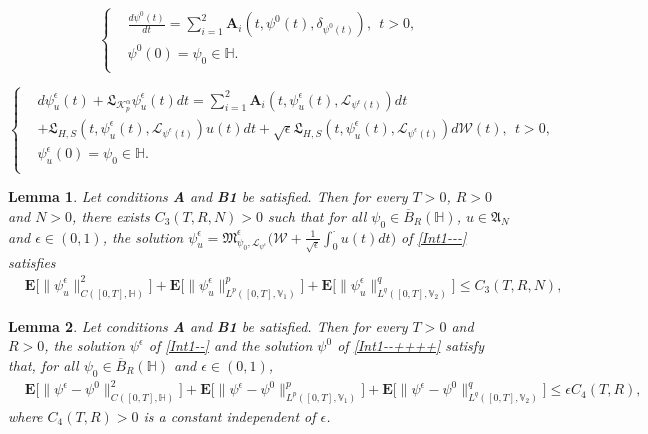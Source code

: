 \documentclass[10pt,a4paper]{amsart}
\newtheorem{lemma}{Lemma}
\renewcommand{\leq}{\leqslant}
\begin{document}
\begin{equation}\label{Int1--++++}
\left\{
  \begin{aligned}
  &\frac{d \psi^0(t)}{dt}
=\sum_{i=1}^2\textbf{A}_i(t,\psi^0(t),\delta_{\psi^0(t)})
, \ \ t>0, \\
  &\psi^0(0)=\psi_0\in \mathbb{H}.\\
  \end{aligned}
\right.
\end{equation}

\begin{equation}\label{Int1---}
\left\{
  \begin{aligned}
  &d \psi_u^\epsilon(t)+ \mathfrak{L}_{\mathcal{K}_{p}^\alpha} \psi_u^\epsilon(t) dt
=\sum_{i=1}^2\textbf{A}_i(t,\psi_u^\epsilon(t),
\mathcal{L}_{
\psi^\epsilon(t)})dt\\&+
\mathfrak{L}_{H,S}
(t,\psi_u^\epsilon(t),
\mathcal{L}_{
\psi^\epsilon(t)})u(t)dt+ \sqrt{\epsilon}\mathfrak{L}_{H,S}
(t,\psi_u^\epsilon(t),
\mathcal{L}_{
\psi^\epsilon(t)})d\mathcal{W}(t), \ \ t>0, \\
  &\psi_u^\epsilon(0)=\psi_0\in \mathbb{H}.\\
  \end{aligned}
\right.
\end{equation}

\begin{lemma}\label{SCE1}
Let conditions  {\bf A} and {\bf B1}
be satisfied. Then for every $T>0$, $R>0$ and $N>0$, there exists $C_3(T,R,N)>0$ such that for all $\psi_{0}\in \overline{B}_{R}(\mathbb{H})$, $u\in \mathfrak{A}_N$ and $\epsilon\in(0,1)$,
the solution $\psi^\epsilon_u=\mathfrak{M}_{\psi_0,\mathcal{L}_{\psi^\epsilon}}^\epsilon
\Big(\mathcal{W}+\frac{1}{\sqrt{\epsilon}}
\int_0^\cdot u(t)dt\Big)$ of \eqref{Int1---} satisfies
\begin{align*}
&\mathbf{E}\Big[\|\psi^\epsilon_u
\|^2_{C([0,T],\mathbb{H} )}\Big]+\mathbf{E}\Big[
\|\psi^\epsilon_u\|^p_{L^p([0,T],\mathbb{V}_1 )}\Big]+\mathbf{E}\Big[\|\psi^\epsilon_u\|^q_{L^q([0,T], \mathbb{V}_2)}\Big]\leq C_3(T,R, N),
\end{align*}
\end{lemma}

\begin{lemma}\label{SCE2}
Let conditions  {\bf A} and {\bf B1}
be satisfied. Then for every $T>0$ and $R>0$,
the solution  $\psi^\epsilon$ of \eqref{Int1--} and the solution $\psi^0$
of \eqref{Int1--++++}  satisfy that, for all $\psi_{0}\in \overline{B}_{R}(\mathbb{H})$ and $\epsilon\in(0,1)$,
\begin{align*}
&\mathbf{E}\Big[\|\psi^\epsilon-\psi^0
\|^2_{C([0,T],\mathbb{H} )}\Big]
+\mathbf{E}\Big[
\|\psi^\epsilon-\psi^0\|^p_{L^p([0,T],\mathbb{V}_1 )}\Big]+\mathbf{E}\Big[\|\psi^\epsilon-\psi^0\|^q_{L^q([0,T], \mathbb{V}_2)}\Big]
\leq \epsilon C_4(T,R),
\end{align*}
where $C_4(T,R)>0$ is a constant
independent of $\epsilon$.
\end{lemma}
\end{document}
